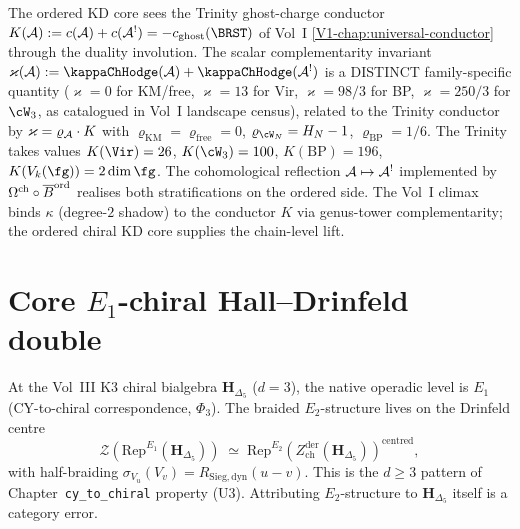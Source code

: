 \begin{remark}
\label{rem:ordered-kd-core-conductor-bridge}
The ordered KD core sees the Trinity ghost-charge conductor
$K(\cA) := c(\cA) + c(\cA^!) = -c_{\mathrm{ghost}}(\BRST)$ of Vol~I
\cref{V1-chap:universal-conductor} through the duality involution.
The scalar complementarity invariant
$\varkappa(\cA) := \kappaChHodge(\cA) + \kappaChHodge(\cA^!)$ is a DISTINCT
family-specific quantity ($\varkappa = 0$ for KM/free, $\varkappa = 13$
for Vir, $\varkappa = 98/3$ for BP, $\varkappa = 250/3$ for $\cW_3$, as
catalogued in Vol~I landscape census), related to the Trinity conductor
by $\varkappa = \varrho_{\mathcal{A}}\cdot K$ with
$\varrho_{\mathrm{KM}} = \varrho_{\mathrm{free}} = 0$,
$\varrho_{\cW_N} = H_N - 1$, $\varrho_{\mathrm{BP}} = 1/6$. The
Trinity takes values $K(\Vir) = 26$, $K(\cW_3) = 100$,
$K(\mathrm{BP}) = 196$, $K(V_k(\fg)) = 2\dim\fg$. The cohomological
reflection $\mathcal{A} \mapsto \mathcal{A}^!$ implemented by $\Omega^{\mathrm{ch}}\circ
\overline{B}^{\mathrm{ord}}$ realises both stratifications on the ordered side. The Vol~I climax binds $\kappa$ (degree-$2$ shadow)
to the conductor $K$ via genus-tower complementarity; the
ordered chiral KD core supplies the chain-level lift.
\end{remark}

\section{Core \(E_1\)-chiral Hall--Drinfeld double}
\label{sec:oackd-core-supplement}

\begin{remark}[\texorpdfstring{\(E_1\)-native at \(d = 3\) with \(E_2\) via Drinfeld centre}{E1-native at d = 3 with E2 via Drinfeld centre}]
\label{rem:oackd-core-E1-E2}
At the Vol~III K3 chiral bialgebra $\mathbf{H}_{\Delta_5}$ ($d = 3$), the native operadic level
is $E_1$ (CY-to-chiral correspondence, $\Phi_3$). The braided $E_2$-structure lives on
the Drinfeld centre
\[
 \mathcal{Z}(\mathrm{Rep}^{E_1}(\mathbf{H}_{\Delta_5})) \;\simeq\; \mathrm{Rep}^{E_2}(Z^{\mathrm{der}}_{\mathrm{ch}}(\mathbf{H}_{\Delta_5}))^{\mathrm{centred}},
\]
with half-braiding $\sigma_{V_u}(V_v) = R_{\mathrm{Sieg,dyn}}(u - v)$. This is the $d \ge 3$
pattern of Chapter~\texttt{cy\_to\_chiral} property (U$3$). Attributing $E_2$-structure to
$\mathbf{H}_{\Delta_5}$ itself is a category error.
\end{remark}

